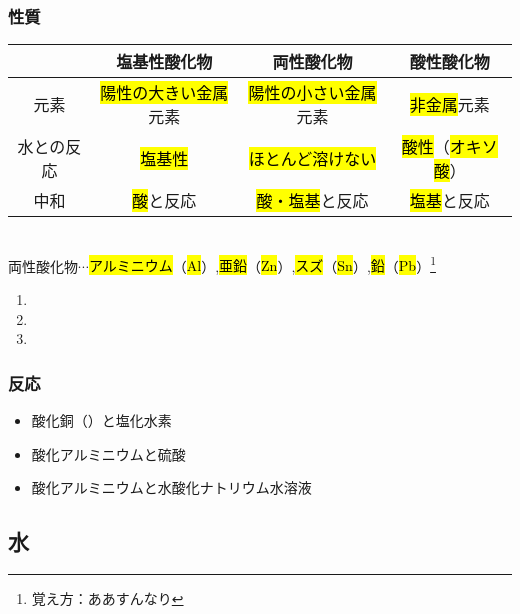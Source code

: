 \subsubsection{性質}
\begin{tabular}{|c|c|c|c|}\hline
            & 塩基性酸化物          & 両性酸化物           & 酸性酸化物              \\ \hline
      元素    & \hl{陽性の大きい金属}元素 & \hl{陽性の小さい金属}元素 & \hl{非金属}元素         \\ \hline
      水との反応 & \hl{塩基性}        & \hl{ほとんど溶けない}   & \hl{酸性}（\hl{オキソ酸}） \\ \hline
      中和    & \hl{酸}と反応       & \hl{酸・塩基}と反応    & \hl{塩基}と反応         \\ \hline
\end{tabular}\\
両性酸化物$\cdots$\hl{アルミニウム}（\hl{Al}）,\hl{亜鉛}（\hl{Zn}）,\hl{スズ}（\hl{Sn}）,\hl{鉛}（\hl{Pb}）\footnote{覚え方：ああすんなり}
\begin{enumerate}[\R]
      \item {}
      \item {}
      \item {}
\end{enumerate}
\subsubsection{反応}
\begin{itemize}
      \item 酸化銅（）と塩化水素\\
      \item 酸化アルミニウムと硫酸\\
      \item 酸化アルミニウムと水酸化ナトリウム水溶液\\
\end{itemize}
\subsection{水}
